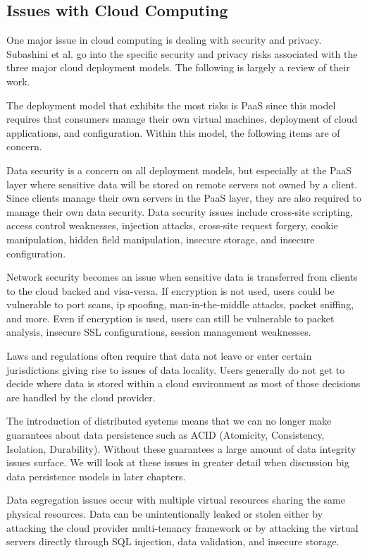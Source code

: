 \documentclass[]{article}
\begin{document}
\subsection{Issues with Cloud Computing} \label{ssec:issues-with-cloud-computing}
One major issue in cloud computing is dealing with security and privacy. Subashini et al.\cite{subashini_survey_2011} go into the specific security and privacy risks associated with the three major cloud deployment models. The following is largely a review of their work. 

The deployment model that exhibits the most risks is PaaS since this model requires that consumers manage their own virtual machines, deployment of cloud applications, and configuration. Within this model, the following items are of concern. 

Data security is a concern on all deployment models, but especially at the PaaS layer where sensitive data will be stored on remote servers not owned by a client. Since clients manage their own servers in the PaaS layer, they are also required to manage their own data security. Data security issues include cross-site scripting, access control weaknesses, injection attacks, cross-site request forgery, cookie manipulation, hidden field manipulation, insecure storage, and insecure configuration.

Network security becomes an issue when sensitive data is transferred from clients to the cloud backed and visa-versa. If encryption is not used, users could be vulnerable to port scans, ip spoofing, man-in-the-middle attacks, packet sniffing, and more. Even if encryption is used, users can still be vulnerable to packet analysis, insecure SSL configurations, session management weaknesses.

Laws and regulations often require that data not leave or enter certain jurisdictions giving rise to issues of data locality. Users generally do not get to decide where data is stored within a cloud environment as most of those decisions are handled by the cloud provider.

The introduction of distributed systems means that we can no longer make guarantees about data persistence such as ACID (Atomicity, Consistency, Isolation, Durability). Without these guarantees a large amount of data integrity issues surface. We will look at these issues in greater detail when discussion big data persistence models in later chapters.

Data segregation issues occur with multiple virtual resources sharing the same physical resources. Data can be unintentionally leaked or stolen either by attacking the cloud provider multi-tenancy framework or by attacking the virtual servers directly through SQL injection, data validation, and insecure storage.
\end{document}
